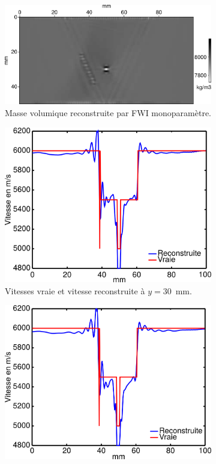 \begin{figure}[p]
\begin{changemargin}{-2cm}{-2cm}
\begin{subfigure}[b]{0.29\textwidth}
		\end{subfigure}
		\begin{subfigure}[b]{0.29\textwidth}
			\includegraphics[width=\textwidth]{img/mono_param/rho_mono.png}
			\caption{Masse volumique reconstruite par FWI monoparamètre.}
		\end{subfigure}
		\begin{subfigure}[b]{0.29\textwidth}
			\includegraphics[width=\textwidth]{img/mono_param/coupe_vp_mono_uni_hor.png}
			\caption{Vitesses vraie et vitesse reconstruite à $y=30$~mm.}
		\end{subfigure}
		\begin{subfigure}[b]{0.29\textwidth}
			\includegraphics[width=\textwidth]{img/mono_param/coupe_vp_mono_smooth_hor.png}

\end{subfigure}
\end{changemargin}
\end{figure}
